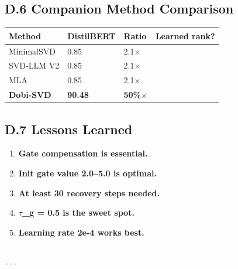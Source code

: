 \subsection{D.6 Companion Method Comparison}

\begin{table}[H]
\centering
\small
\begin{tabular}{llll}
\toprule
\textbf{Method} & \textbf{DistilBERT} & \textbf{Ratio} & \textbf{Learned rank?} \\
\midrule
MinimalSVD & 0.85 & 2.1$\times$ &  \\
SVD-LLM V2 & 0.85 & 2.1$\times$ &  \\
MLA & 0.85 & 2.1$\times$ &  \\
\textbf{Dobi-SVD} & \textbf{90.48} & \textbf{50\%$\times$} & \textbf{ } \\
\bottomrule
\end{tabular}
\end{table}

\subsection{D.7 Lessons Learned}

\begin{enumerate}
\item \textbf{Gate compensation is essential.}
\item \textbf{Init gate value 2.0--5.0 is optimal.}
\item \textbf{At least 30 recovery steps needed.}
\item \textbf{$\tau$\_g = 0.5 is the sweet spot.}
\item \textbf{Learning rate 2e-4 works best.}
\end{enumerate}
\begin{lstlisting}

---
\end{lstlisting}